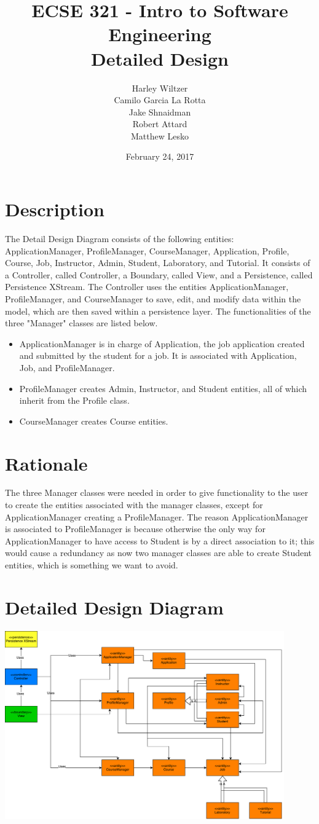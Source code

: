 \documentclass[12pt]{article}
\title{ECSE 321 - Intro to Software Engineering\\Detailed Design}
\author{Harley Wiltzer\\Camilo Garcia La Rotta\\Jake Shnaidman\\Robert Attard\\Matthew Lesko}
\date{February 24, 2017}
\begin{document}
\maketitle
\newpage
{} %
\tableofcontents
\section{Description}
The Detail Design Diagram consists of the following entities: ApplicationManager, ProfileManager, CourseManager, Application, Profile, Course, Job, Instructor, Admin, Student, Laboratory, and Tutorial. It consists of a Controller, called Controller, a Boundary, called View, and a Persistence, called Persistence XStream. The Controller uses the entities ApplicationManager, ProfileManager, and CourseManager to save, edit, and modify data within the model, which are then saved within a persistence layer. The functionalities of the three "Manager" classes are listed below.
\begin{itemize}
	\item ApplicationManager is in charge of Application, the job application created and submitted by the student for a job. It is associated with Application, Job, and ProfileManager.
	\item ProfileManager creates Admin, Instructor, and Student entities, all of which inherit from the Profile class.
	\item CourseManager creates Course entities.
\end{itemize}
\section{Rationale}
The three Manager classes were needed in order to give functionality to the user to create the entities associated with the manager classes, except for ApplicationManager creating a ProfileManager. The reason ApplicationManager is associated to ProfileManager is because otherwise the only way for ApplicationManager to have access to Student is by a direct association to it; this would cause a redundancy as now two manager classes are able to create Student entities, which is something we want to avoid.
\section{Detailed Design Diagram}
\centering
\includegraphics[width =0.9\textwidth]{DetailedDesignDiagram.pdf}
\end{document}
